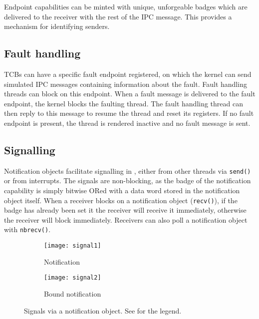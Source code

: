 Endpoint capabilities can be minted with unique, unforgeable badges which are delivered to the
receiver with the rest of the IPC message. This provides a mechanism for identifying senders.

\subsection{Fault handling}

\glspl{TCB} can have a specific fault endpoint registered, on which the kernel can send simulated
\gls{IPC} messages containing information about the fault. Fault handling threads can block on this 
endpoint. When a fault message is delivered to the fault endpoint, the kernel blocks the faulting
thread. The fault handling thread can then reply to this message to resume the thread and reset its
registers. If no fault endpoint is present, the
thread is rendered inactive and no fault message is sent. 

\subsection{Signalling}

Notification objects facilitate signalling in \selfour, either from other threads via \texttt{send()} or from
interrupts. The signals are non-blocking, as the badge of the notification capability is simply
bitwise ORed with a data word stored in the notification object itself. When a receiver blocks on a
notification object (\texttt{recv()}), if the badge has already been set it the receiver will
receive it immediately, otherwise the receiver will block immediately. Receivers can also poll a
notification object with \texttt{nbrecv()}.

\begin{figure}
    \centering
    \begin{subfigure}[h]{0.48\textwidth}
        \centering
        \texttt{[image: signal1]}
        \caption{Notification}
        \label{f:signal1}
    \end{subfigure}%
    \begin{subfigure}[h]{0.48\textwidth}
        \centering
        \texttt{[image: signal2]}
        \caption{Bound notification}
        \label{f:signal2}
    \end{subfigure}
    \label{f:signal}
    \caption{Signals via a notification object. See  for the legend.}
\end{figure}


